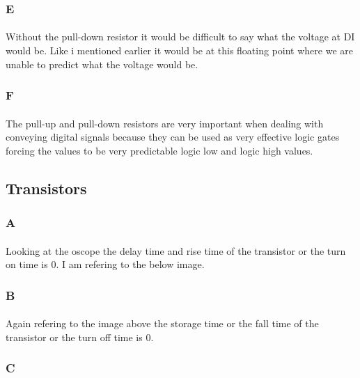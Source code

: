 \documentclass[12pt]{article}
\begin{document}
			\subsubsection{E}
				\paragraph{}
					Without the pull-down resistor it would be difficult to say what the voltage at DI would be.  Like i mentioned earlier it would be at this floating point
					where we are unable to predict what the voltage would be.

			\subsubsection{F}
				\paragraph{}
					The pull-up and pull-down resistors are very important when dealing with conveying digital signals because they can be used as very effective 
					logic gates forcing the values to be very predictable logic low and logic high values.

		\subsection{Transistors}
			\subsubsection{A}
				\paragraph{}
					Looking at the oscope the delay time and rise time of the transistor or the turn on time is 0.  I am refering to the below image.
			
			\subsubsection{B}
				\paragraph{}
					Again refering to the image above the storage time or the fall time of the transistor or the turn off time is 0.

			\subsubsection{C}
\end{document}
